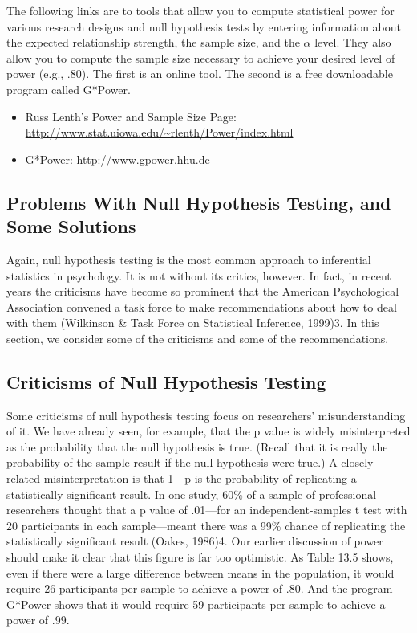 The following links are to tools that allow you to compute statistical power for various research designs and null hypothesis tests by entering information about the expected relationship strength, the sample size, and the $\alpha$ level. They also allow you to compute the sample size necessary to achieve your desired level of power (e.g., .80). The first is an online tool. The second is a free downloadable program called G*Power.

\begin{itemize}
\item Russ Lenth's Power and Sample Size Page: \url{http://www.stat.uiowa.edu/~rlenth/Power/index.html}
\item \url{G*Power: http://www.gpower.hhu.de}
\end{itemize}

\subsection{Problems With Null Hypothesis Testing, and Some Solutions}


Again, null hypothesis testing is the most common approach to inferential statistics in psychology. It is not without its critics, however. In fact, in recent years the criticisms have become so prominent that the American Psychological Association convened a task force to make recommendations about how to deal with them (Wilkinson \& Task Force on Statistical Inference, 1999)3. In this section, we consider some of the criticisms and some of the recommendations.


\subsection{Criticisms of Null Hypothesis Testing}


Some criticisms of null hypothesis testing focus on researchers' misunderstanding of it. We have already seen, for example, that the p value is widely misinterpreted as the probability that the null hypothesis is true. (Recall that it is really the probability of the sample result if the null hypothesis were true.) A closely related misinterpretation is that 1 - p is the probability of replicating a statistically significant result. In one study, 60\% of a sample of professional researchers thought that a p value of .01---for an independent-samples t test with 20 participants in each sample---meant there was a 99\% chance of replicating the statistically significant result (Oakes, 1986)4. Our earlier discussion of power should make it clear that this figure is far too optimistic. As Table 13.5 shows, even if there were a large difference between means in the population, it would require 26 participants per sample to achieve a power of .80. And the program G*Power shows that it would require 59 participants per sample to achieve a power of .99.


